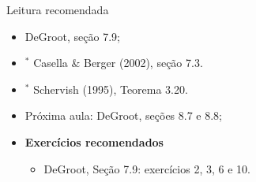\begin{frame}{Leitura recomendada}
\begin{itemize}
 \item[\faBook] DeGroot, seção 7.9;
 \item[\faBook] $^\ast$ Casella \& Berger (2002), seção 7.3.
 \item[\faBook] $^\ast$ Schervish (1995),  Teorema 3.20.
 \item[\faForward] Próxima aula: DeGroot, seções 8.7 e 8.8;
 \item {\large\textbf{Exercícios recomendados}}
 \begin{itemize}
  \item[\faBookmark] DeGroot, Seção 7.9: exercícios 2, 3, 6 e 10.
  \end{itemize}
 \end{itemize} 
\end{frame}
